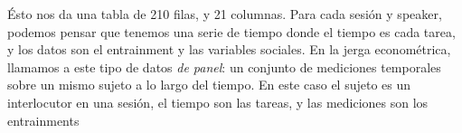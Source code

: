 Ésto nos da una tabla de 210 filas, y 21 columnas. Para cada sesión y speaker, podemos pensar que tenemos una serie de tiempo donde el tiempo es cada tarea, y los datos son el entrainment y las variables sociales. En la jerga econométrica, llamamos a este tipo de datos \emph{de panel}\cite{gujarati1999}: un conjunto de mediciones temporales sobre un mismo sujeto a lo largo del tiempo. En este caso el sujeto es un interlocutor en una sesión, el tiempo son las tareas, y las mediciones son los entrainments


\begin{figure}
\centering


\label{panel_data}
\end{figure}
